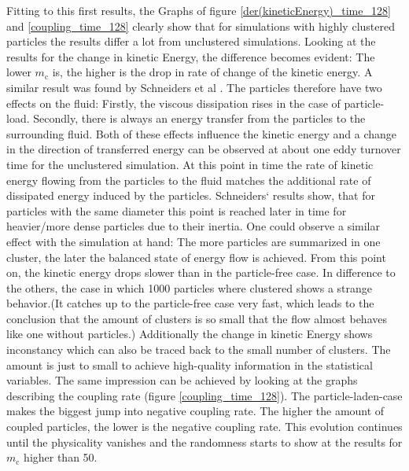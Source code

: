 \documentclass[11pt,a4paper,openany,oneside,parskip=half*]{article}
\begin{document}
\newline
Fitting to this first results, the Graphs of figure \ref{der(kineticEnergy)_time_128} and \ref{coupling_time_128} clearly show that for simulations with highly clustered particles the results differ a lot from unclustered simulations. Looking at the results for the change in kinetic Energy, the difference becomes evident: The lower $ m_\mathrm{c} $ is, the higher is the drop in rate of change of the kinetic energy. A similar result was found by Schneiders et al \cite{Schneiders2017}. The particles therefore have two effects on the fluid: Firstly, the viscous dissipation rises in the case of particle-load. Secondly, there is always an energy transfer from the particles to the surrounding fluid. Both of these effects influence the kinetic energy and a change in the direction of transferred energy can be observed at about one eddy turnover time for the unclustered simulation. At this point in time the rate of kinetic energy flowing from the particles to the fluid matches the additional rate of dissipated energy induced by the particles.
\newline
Schneiders` results show, that for particles with the same diameter this point is reached later in time for heavier/more dense particles due to their inertia. One could observe a similar effect with the simulation at hand: The more particles are summarized in one cluster, the later the balanced state of energy flow is achieved. From this point on, the kinetic energy drops slower than in the particle-free case.
\newline
In difference to the others, the case in which 1000 particles where clustered shows a strange behavior.(It catches up to the particle-free case very fast, which leads to the conclusion that the amount of clusters is so small that the flow almost behaves like one without particles.) Additionally the change in kinetic Energy shows inconstancy which can also be traced back to the small number of clusters. The amount is just to small to achieve high-quality information in the statistical variables. 
\newline
The same impression can be achieved by looking at the graphs describing the coupling rate (figure \ref{coupling_time_128}). The particle-laden-case makes the biggest jump into negative coupling rate. The higher the amount of coupled particles, the lower is the negative coupling rate. This evolution continues until the physicality vanishes and the randomness starts to show at the results for $m_\mathrm{c}$ higher than 50. 
\newline
\end{document}

